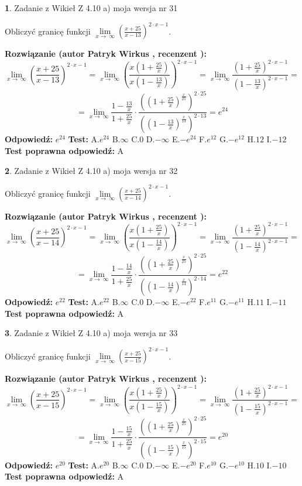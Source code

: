 \documentclass[12pt, a4paper]{article}
\theoremstyle{definition} %
\newtheorem{zad}{}
\newcommand{\zadStart}[1]{\begin{zad}#1\newline}
\newcommand{\zadStop}{\end{zad}}
\newcommand{\rozwStart}[2]{\noindent \textbf{Rozwiązanie (autor #1 , recenzent #2): }\newline}
\newcommand{\rozwStop}{\newline}
\newcommand{\odpStart}{\noindent \textbf{Odpowiedź:}\newline}
\newcommand{\odpStop}{\newline}
\newcommand{\testStart}{\noindent \textbf{Test:}\newline}
\newcommand{\testStop}{\newline}
\newcommand{\kluczStart}{\noindent \textbf{Test poprawna odpowiedź:}\newline}
\newcommand{\kluczStop}{\newline}
\begin{document}
\zadStart{Zadanie z Wikieł Z 4.10 a) moja wersja nr 31}

Obliczyć granicę funkcji  $\lim\limits_{x\to\ \infty}(\frac{x+25}{x-13})^{2\cdot x-1}$.
\zadStop
\rozwStart{Patryk Wirkus}{}
$$\lim\limits_{x\to\ \infty}(\frac{x+25}{x-13})^{2\cdot x-1} = \lim\limits_{x\to\ \infty}(\frac{x(1+\frac{25}{x})}{x(1-\frac{13}{x})})^{2\cdot x-1}=\lim\limits_{x\to\ \infty}\frac{(1+\frac{25}{x})^{2\cdot x-1}}{(1-\frac{13}{x})^{2\cdot x-1}}=$$
$$=\lim\limits_{x\to\ \infty}\frac{1-\frac{13}{x}}{1+\frac{25}{x}}\cdot\frac{((1+\frac{25}{x})^{\frac{x}{25}})^{2\cdot25}}{((1-\frac{13}{x})^{\frac{x}{13}})^{2\cdot13}}=e^{24}$$
\rozwStop
\odpStart
$e^{24}$
\odpStop
\testStart
A.$e^{24}$ B.$\infty$ C.$0$ D.$-\infty$ E.$-e^{24}$
F.$e^{12}$ G.$-e^{12}$
H.$12$
I.$-12$
\testStop
\kluczStart
A
\kluczStop



\zadStart{Zadanie z Wikieł Z 4.10 a) moja wersja nr 32}

Obliczyć granicę funkcji  $\lim\limits_{x\to\ \infty}(\frac{x+25}{x-14})^{2\cdot x-1}$.
\zadStop
\rozwStart{Patryk Wirkus}{}
$$\lim\limits_{x\to\ \infty}(\frac{x+25}{x-14})^{2\cdot x-1} = \lim\limits_{x\to\ \infty}(\frac{x(1+\frac{25}{x})}{x(1-\frac{14}{x})})^{2\cdot x-1}=\lim\limits_{x\to\ \infty}\frac{(1+\frac{25}{x})^{2\cdot x-1}}{(1-\frac{14}{x})^{2\cdot x-1}}=$$
$$=\lim\limits_{x\to\ \infty}\frac{1-\frac{14}{x}}{1+\frac{25}{x}}\cdot\frac{((1+\frac{25}{x})^{\frac{x}{25}})^{2\cdot25}}{((1-\frac{14}{x})^{\frac{x}{14}})^{2\cdot14}}=e^{22}$$
\rozwStop
\odpStart
$e^{22}$
\odpStop
\testStart
A.$e^{22}$ B.$\infty$ C.$0$ D.$-\infty$ E.$-e^{22}$
F.$e^{11}$ G.$-e^{11}$
H.$11$
I.$-11$
\testStop
\kluczStart
A
\kluczStop



\zadStart{Zadanie z Wikieł Z 4.10 a) moja wersja nr 33}

Obliczyć granicę funkcji  $\lim\limits_{x\to\ \infty}(\frac{x+25}{x-15})^{2\cdot x-1}$.
\zadStop
\rozwStart{Patryk Wirkus}{}
$$\lim\limits_{x\to\ \infty}(\frac{x+25}{x-15})^{2\cdot x-1} = \lim\limits_{x\to\ \infty}(\frac{x(1+\frac{25}{x})}{x(1-\frac{15}{x})})^{2\cdot x-1}=\lim\limits_{x\to\ \infty}\frac{(1+\frac{25}{x})^{2\cdot x-1}}{(1-\frac{15}{x})^{2\cdot x-1}}=$$
$$=\lim\limits_{x\to\ \infty}\frac{1-\frac{15}{x}}{1+\frac{25}{x}}\cdot\frac{((1+\frac{25}{x})^{\frac{x}{25}})^{2\cdot25}}{((1-\frac{15}{x})^{\frac{x}{15}})^{2\cdot15}}=e^{20}$$
\rozwStop
\odpStart
$e^{20}$
\odpStop
\testStart
A.$e^{20}$ B.$\infty$ C.$0$ D.$-\infty$ E.$-e^{20}$
F.$e^{10}$ G.$-e^{10}$
H.$10$
I.$-10$
\testStop
\kluczStart
A
\kluczStop
\end{document}
